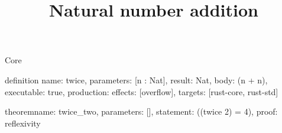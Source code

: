 \begin{lexlean}{Core}
\title{Natural number addition}
\begin{semanticmodule}
definition{
  name: twice,
  parameters: [n : Nat],
  result: Nat,
  body: (n + n),
  executable: true,
  production: {effects: [overflow], targets: [rust-core, rust-std]}
}

theorem{name: twice_two, parameters: [], statement: ((twice 2) = 4), proof: reflexivity{}}
\end{semanticmodule}
\end{lexlean}
